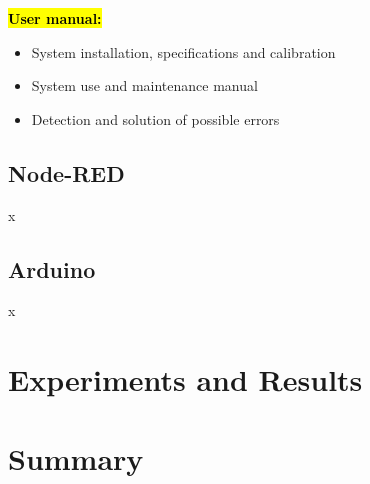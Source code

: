 \documentclass{article}
\begin{document}
\textcolor{red}{\textbf{\hl{User manual:}}}
\begin{itemize}
	\item System installation, specifications and calibration
	\item System use and maintenance manual
	\item Detection and solution of possible errors
\end{itemize}

\subsection{Node-RED}
x

\subsection{Arduino}
x

\section{Experiments and Results}

\section{Summary}
\end{document}

